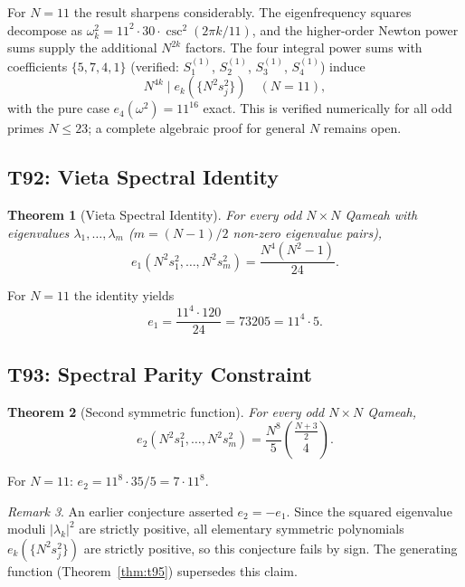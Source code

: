 \documentclass[aip,jmp,reprint,superscriptaddress,floatfix,nofootinbib]{revtex4-2}
\newtheorem{theorem}{Theorem}
\theoremstyle{definition}
\theoremstyle{remark}
\newtheorem{remark}[theorem]{Remark}
\begin{document}
For $N=11$ the result sharpens considerably.  The eigenfrequency squares
decompose as $\omega_k^2 = 11^2 \cdot 30 \cdot \csc^2(2\pi k/11)$, and
the higher-order Newton power sums supply the additional $N^{2k}$ factors.
The four integral power sums
with coefficients $\{5, 7, 4, 1\}$ (verified: $S_1^{(1)}$, $S_2^{(1)}$,
$S_3^{(1)}$, $S_4^{(1)}$) induce
\[
N^{4k} \mid e_k(\{N^2 s_j^2\}) \quad (N=11),
\]
with the pure case $e_4(\omega^2) = 11^{16}$ exact.  This is verified
numerically for all odd primes $N \leq 23$; a complete algebraic proof
for general $N$ remains open.

\subsection{T92: Vieta Spectral Identity}
\label{sec:t92-vieta-spectral}

\begin{theorem}[Vieta Spectral Identity]
\label{thm:t92}
For every odd $N{\times}N$ Qameah with eigenvalues
$\lambda_1,\ldots,\lambda_m$ ($m = (N-1)/2$ non-zero eigenvalue pairs),
\[
e_1\!\left(N^2 s_1^2,\ldots,N^2 s_m^2\right)
= \frac{N^4(N^2-1)}{24}.
\]
\end{theorem}

For $N=11$ the identity yields
\[
e_1 = \frac{11^4 \cdot 120}{24} = 73205 = 11^4 \cdot 5.
\]
\subsection{T93: Spectral Parity Constraint}
\label{sec:t93-spectral-parity}

\begin{theorem}[Second symmetric function]
\label{thm:t93}
For every odd $N{\times}N$ Qameah,
\[
e_2\!\left(N^2 s_1^2,\ldots,N^2 s_m^2\right)
= \frac{N^{8}}{5}\binom{\tfrac{N+3}{2}}{4}.
\]
\end{theorem}

For $N{=}11$:
$e_2 = 11^{8}\cdot 35/5 = 7\cdot 11^{8}$.

\begin{remark}
An earlier conjecture asserted $e_2 = -e_1$.  Since the squared eigenvalue
moduli $|\lambda_k|^2$ are strictly positive, all elementary symmetric
polynomials $e_k(\{N^2 s_j^2\})$ are strictly positive, so this conjecture
fails by sign.  The generating function (Theorem~\ref{thm:t95}) supersedes
this claim.
\end{remark}
\end{document}
